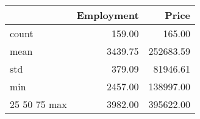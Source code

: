 \begin{tabular}{lrr}
\toprule
 & Employment & Price \\
\midrule
count & 159.00 & 165.00 \\
mean & 3439.75 & 252683.59 \\
std & 379.09 & 81946.61 \\
min & 2457.00 & 138997.00 \\
25%
50%
75%
max & 3982.00 & 395622.00 \\
\bottomrule
\end{tabular}

